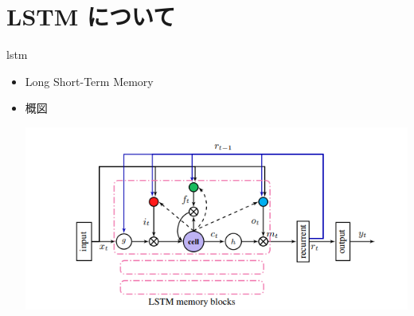 \documentclass[dvipdfmx,10pt,presentation]{beamer}
\begin{document}
\section{LSTM について}
\label{sec:org87191af}
\begin{frame}[allowframebreaks]{lstm}
\begin{itemize}
\item Long Short-Term Memory\\
\item 概図\\
\begin{center}
\includegraphics[width=.9\linewidth]{./lstm.png}
\end{center}
\end{itemize}
\end{frame}
\end{document}
